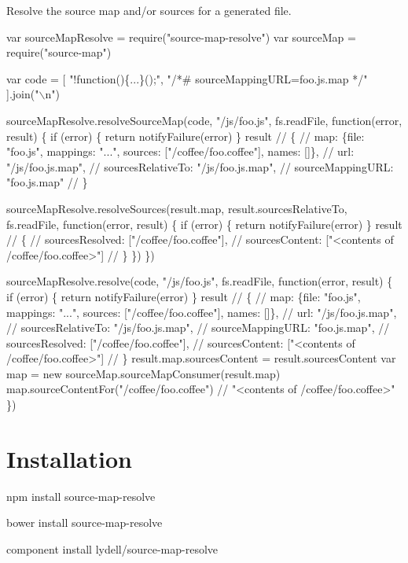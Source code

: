Resolve the source map and/or sources for a generated file.


\begin{DoxyCode}
var sourceMapResolve = require("source-map-resolve")
var sourceMap        = require("source-map")

var code = [
  "!function()\{...\}();",
  "/*# sourceMappingURL=foo.js.map */"
].join("\(\backslash\)n")

sourceMapResolve.resolveSourceMap(code, "/js/foo.js", fs.readFile, function(error, result) \{
  if (error) \{
    return notifyFailure(error)
  \}
  result
  // \{
  //   map: \{file: "foo.js", mappings: "...", sources: ["/coffee/foo.coffee"], names: []\},
  //   url: "/js/foo.js.map",
  //   sourcesRelativeTo: "/js/foo.js.map",
  //   sourceMappingURL: "foo.js.map"
  // \}

  sourceMapResolve.resolveSources(result.map, result.sourcesRelativeTo, fs.readFile, function(error,
       result) \{
    if (error) \{
      return notifyFailure(error)
    \}
    result
    // \{
    //   sourcesResolved: ["/coffee/foo.coffee"],
    //   sourcesContent: ["<contents of /coffee/foo.coffee>"]
    // \}
  \})
\})

sourceMapResolve.resolve(code, "/js/foo.js", fs.readFile, function(error, result) \{
  if (error) \{
    return notifyFailure(error)
  \}
  result
  // \{
  //   map: \{file: "foo.js", mappings: "...", sources: ["/coffee/foo.coffee"], names: []\},
  //   url: "/js/foo.js.map",
  //   sourcesRelativeTo: "/js/foo.js.map",
  //   sourceMappingURL: "foo.js.map",
  //   sourcesResolved: ["/coffee/foo.coffee"],
  //   sourcesContent: ["<contents of /coffee/foo.coffee>"]
  // \}
  result.map.sourcesContent = result.sourcesContent
  var map = new sourceMap.sourceMapConsumer(result.map)
  map.sourceContentFor("/coffee/foo.coffee")
  // "<contents of /coffee/foo.coffee>"
\})
\end{DoxyCode}


\section*{Installation }


\begin{DoxyItemize}
\item {\ttfamily npm install source-\/map-\/resolve}
\item {\ttfamily bower install source-\/map-\/resolve}
\item {\ttfamily component install lydell/source-\/map-\/resolve}
\end{DoxyItemize}


